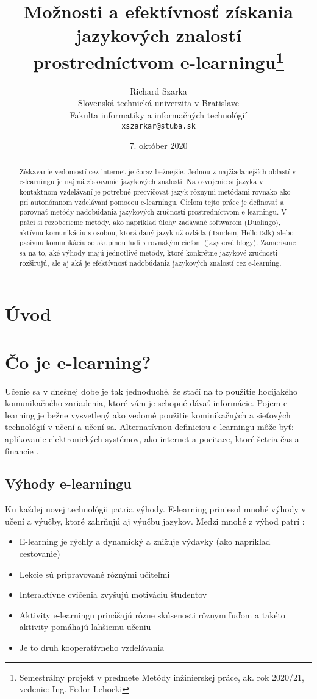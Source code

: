 \documentclass[10pt,twoside,slovak,a4paper]{article}
\title{Možnosti a efektívnosť získania jazykových znalostí prostredníctvom
e-learningu\thanks{Semestrálny projekt v predmete Metódy inžinierskej práce, ak. rok 2020/21, vedenie: Ing. Fedor Lehocki }} %
\author{Richard Szarka\\[2pt]
	{\small Slovenská technická univerzita v Bratislave}\\
	{\small Fakulta informatiky a informačných technológií}\\
	{\small \texttt{xszarkar@stuba.sk}}
	}
\date{\small 7. október 2020} %
\begin{document}
\maketitle

\begin{abstract}
Získavanie vedomostí cez internet je čoraz bežnejšie. Jednou z najžiadanejších oblastí v e-learningu je najmä získavanie jazykových znalostí. Na osvojenie si jazyka v kontaktnom vzdelávaní je potrebné precvičovať jazyk rôznymi metódami rovnako ako pri autonómnom vzdelávaní pomocou e-learningu. Cieľom tejto práce je definovať a porovnať metódy nadobúdania jazykových zručností prostredníctvom e-learningu. V práci si rozoberieme metódy, ako napríklad úlohy zadávané softwarom (Duolingo), aktívnu komunikáciu s osobou, ktorá daný jazyk už ovláda (Tandem, HelloTalk) alebo pasívnu komunikáciu so skupinou ľudí s rovnakým cieľom (jazykové blogy). Zameriame sa na to, aké výhody majú jednotlivé metódy, ktoré konkrétne jazykové zručnosti rozširujú, ale aj aká je efektívnosť nadobúdania jazykových znalostí cez e-learning.
\end{abstract}

\section{Úvod} %

\section{Čo je e-learning?}%
Učenie sa v dnešnej dobe je tak jednoduché, že stačí na to použitie hocijakého komunikačného zariadenia, ktoré vám je schopné dávať informácie\cite{vyhody}. Pojem e-learning je bežne vysvetlený ako vedomé použitie kominikačných a sieťových technológií v učení a učení sa. Alternatívnou definiciou e-learningu môže byť: aplikovanie elektronických systémov, ako internet a pocitace, ktoré šetria čas a financie \cite{efektivnost}. 

\subsection{Výhody e-learningu}%
Ku každej novej technológii patria výhody. E-learning priniesol mnohé výhody v učení a výučby, ktoré zahrňujú aj výučbu jazykov. Medzi mnohé z výhod patrí :\\
\begin{itemize}
\item E-learning je rýchly a dynamický a znižuje výdavky (ako napríklad cestovanie) \cite{efektivnost}
\item Lekcie sú pripravované rôznými učiteľmi \cite{efektivnost}
\item Interaktívne cvičenia zvyšujú motiváciu študentov \cite{vyhody}
\item Aktivity e-learningu prinášajú rôzne skúsenosti rôznym ľuďom a takéto aktivity pomáhajú lahšiemu učeniu \cite{vyhody}
\item Je to druh kooperatívneho vzdelávania \cite{efektivnost}
\end{itemize}
\end{document}
